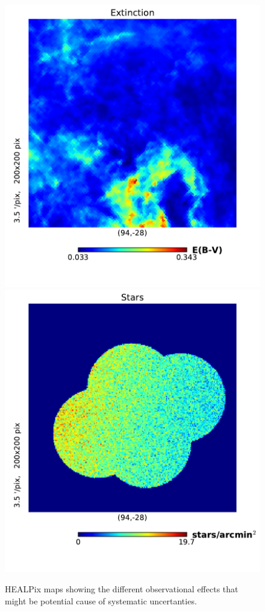 \documentclass[\docopts]{\docclass}
\begin{document}
\begin{figure}
\centering
\includegraphics[width=0.7\columnwidth]{extinction_SFD.pdf}
\includegraphics[width=0.7\columnwidth]{stars_map_2048.pdf}
\caption{HEALPix maps showing the different observational effects that might be potential cause of systematic uncertanties.}
\label{fig:systematic_maps2}
\end{figure}
\end{document}
